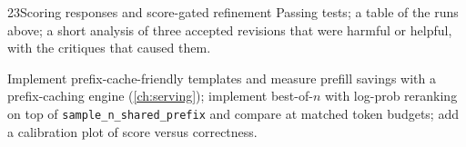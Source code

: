 \begin{labbox}{23}{Scoring responses and score-gated refinement}
Passing tests; a table of the runs above; a short analysis of three accepted revisions that were
harmful or helpful, with the critiques that caused them.

Implement prefix-cache-friendly templates and measure prefill savings with a prefix-caching engine
(\cref{ch:serving}); implement best-of-$n$ with log-prob reranking on top of
\texttt{sample\_n\_shared\_prefix} and compare at matched token budgets; add a calibration plot of
score versus correctness.
\end{labbox}
